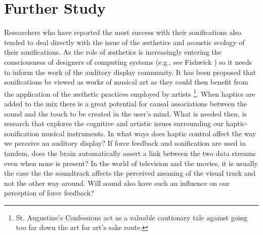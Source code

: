 \documentclass[runningheads]{llncs}
\begin{document}
\section{Further Study}
Researchers who have reported the most success with their sonifications also tended to deal directly with the issue of the æsthetics and acoustic ecology of their sonifications. As the role of æsthetics is increasingly entering the consciousness of designers of computing systems (e.g., see Fishwick \cite{Fishwick:2006}) so it needs to inform the work of the auditory display community. It has been proposed that sonifications be viewed as works of musical art as they could then benefit from the application of the æsthetic practices employed by artists \cite{Vickers:2006a}\footnote{St. Augustine's Confessions act as a valuable cautionary tale against going too far down the art for art's sake route.}. When haptics are added to the mix there is a great potential for causal associations between the sound and the touch to be created in the user's mind. What is needed then, is research that explores the cognitive and artistic issues surrounding our haptic-sonification musical instruments. In what ways does haptic control affect the way we perceive an auditory display? If force feedback and sonification are used in tandem, does the brain automatically assert a link between the two data streams even when none is present? In the world of television and the movies, it is usually the case the the soundtrack affects the perceived meaning of the visual track and not the other way around. Will sound also have such an influence on our perception of force feedback?
\end{document}
